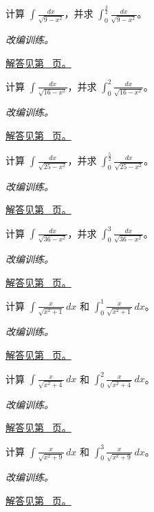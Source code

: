 \documentclass[UTF8,12pt,a4paper,fontset=fandol]{ctexart}
\begin{document}
\begin{example}[圆根式与三角换元]\label{ex:c14q15}
计算 $\displaystyle\int\frac{dx}{\sqrt{9-x^2}}$，并求 $\displaystyle\int_0^{\frac{3}{2}}\frac{dx}{\sqrt{9-x^2}}$。
\par\textit{改编训练。}\par\hyperref[ans:c14q15]{解答见第~\pageref{ans:c14q15} 页。}
\end{example}
\begin{example}[圆根式与三角换元]\label{ex:c14q16}
计算 $\displaystyle\int\frac{dx}{\sqrt{16-x^2}}$，并求 $\displaystyle\int_0^{2}\frac{dx}{\sqrt{16-x^2}}$。
\par\textit{改编训练。}\par\hyperref[ans:c14q16]{解答见第~\pageref{ans:c14q16} 页。}
\end{example}
\begin{example}[圆根式与三角换元]\label{ex:c14q17}
计算 $\displaystyle\int\frac{dx}{\sqrt{25-x^2}}$，并求 $\displaystyle\int_0^{\frac{5}{2}}\frac{dx}{\sqrt{25-x^2}}$。
\par\textit{改编训练。}\par\hyperref[ans:c14q17]{解答见第~\pageref{ans:c14q17} 页。}
\end{example}
\begin{example}[圆根式与三角换元]\label{ex:c14q18}
计算 $\displaystyle\int\frac{dx}{\sqrt{36-x^2}}$，并求 $\displaystyle\int_0^{3}\frac{dx}{\sqrt{36-x^2}}$。
\par\textit{改编训练。}\par\hyperref[ans:c14q18]{解答见第~\pageref{ans:c14q18} 页。}
\end{example}
\begin{example}[双曲型根式的直接代换]\label{ex:c14q19}
计算 $\displaystyle\int\frac{x}{\sqrt{x^2+1}}\,dx$ 和 $\displaystyle\int_0^{1}\frac{x}{\sqrt{x^2+1}}\,dx$。
\par\textit{改编训练。}\par\hyperref[ans:c14q19]{解答见第~\pageref{ans:c14q19} 页。}
\end{example}
\begin{example}[双曲型根式的直接代换]\label{ex:c14q20}
计算 $\displaystyle\int\frac{x}{\sqrt{x^2+4}}\,dx$ 和 $\displaystyle\int_0^{2}\frac{x}{\sqrt{x^2+4}}\,dx$。
\par\textit{改编训练。}\par\hyperref[ans:c14q20]{解答见第~\pageref{ans:c14q20} 页。}
\end{example}
\begin{example}[双曲型根式的直接代换]\label{ex:c14q21}
计算 $\displaystyle\int\frac{x}{\sqrt{x^2+9}}\,dx$ 和 $\displaystyle\int_0^{3}\frac{x}{\sqrt{x^2+9}}\,dx$。
\par\textit{改编训练。}\par\hyperref[ans:c14q21]{解答见第~\pageref{ans:c14q21} 页。}
\end{example}
\end{document}
